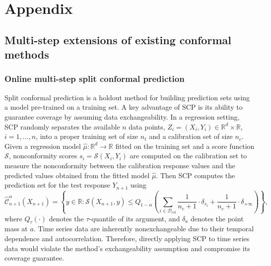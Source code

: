 \documentclass[
  american,
  12pt]{article}
\theoremstyle{plain}
\theoremstyle{plain}
\theoremstyle{remark}
\begin{document}
\begingroup

\renewcommand{\bibsection}{}


\endgroup

\newpage
\appendix
{}%

\setcounter{section}{0}
\setcounter{subsection}{0}
\setcounter{figure}{0}
\setcounter{table}{0}

\renewcommand{\thesection}{\Alph{section}}
\renewcommand{\thesubsection}{A\arabic{subsection}}
\renewcommand{\thefigure}{A\arabic{figure}}
\renewcommand{\thetable}{A\arabic{table}}

\section*{Appendix}\label{appendix}

\subsection{Multi-step extensions of existing conformal
methods}\label{sec-extensions}

\subsubsection{Online multi-step split conformal
prediction}\label{online-multi-step-split-conformal-prediction}

Split conformal prediction \citep[SCP,][]{papadopoulos2002, vovk2005} is
a holdout method for building prediction sets using a model pre-trained
on a training set. A key advantage of SCP is its ability to guarantee
coverage by assuming data exchangeability. In a regression setting, SCP
randomly separates the available \(n\) data points,
\(Z_i = (X_i, Y_i) \in \mathbb{R}^d \times \mathbb{R}\),
\(i=1, \dots, n\), into a proper training set of size \(n_t\) and a
calibration set of size \(n_c\). Given a regression model
\(\hat{\mu}: \mathbb{R}^d \rightarrow \mathbb{R}\) fitted on the
training set and a score function \(\mathcal{S}\), nonconformity scores
\(s_i = \mathcal{S}\left(X_i, Y_i\right)\) are computed on the
calibration set to measure the nonconformity between the calibration
response values and the predicted values obtained from the fitted model
\(\hat{\mu}\). Then SCP computes the prediction set for the test
response \(Y_{n+1}\) using \[
\hat{\mathcal{C}}_{n+1}^{\alpha}\left(X_{n+1}\right) = \left\{y\in\mathbb{R}: \mathcal{S}\left(X_{n+1}, y\right) \leq Q_{1-\alpha}\left(\sum_{i \in \mathcal{D}_{\text{cal}}}\frac{1}{n_c+1}\cdot\delta_{s_{i}}+\frac{1}{n_c+1}\cdot\delta_{+\infty}\right)\right\},
\] where \(Q_\tau(\cdot)\) denotes the \(\tau\)-quantile of its
argument, and \(\delta_a\) denotes the point mass at \(a\). Time series
data are inherently nonexchangeable due to their temporal dependence and
autocorrelation. Therefore, directly applying SCP to time series data
would violate the method's exchangeability assumption and compromise its
coverage guarantee.
\end{document}

